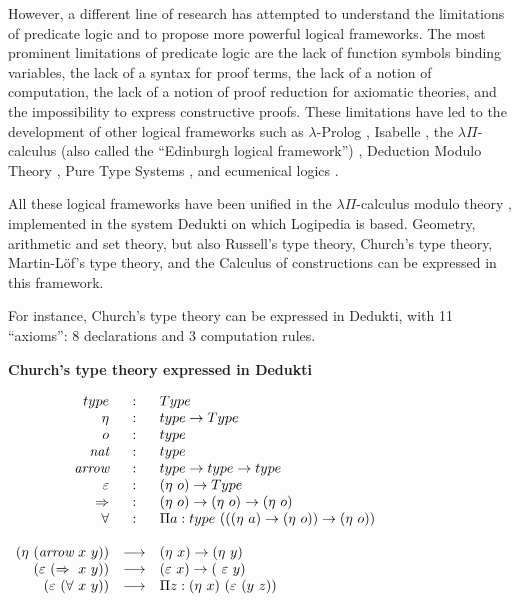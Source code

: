 However, a different line of research has attempted to understand the
limitations of predicate logic and to propose more powerful logical
frameworks.  The most prominent limitations of predicate logic are the
lack of function symbols binding variables, the lack of a syntax for
proof terms, the lack of a notion of computation, the lack of a notion
of proof reduction for axiomatic theories, and the impossibility to
express constructive proofs. These limitations have led to the
development of other logical frameworks such as $\lambda$-Prolog
\cite{MillerNadathur12}, Isabelle \cite{Paulson90},
the $\lambda \Pi$-calculus (also called the ``Edinburgh logical
framework'') \cite{HarperHonsellPlotkin91}, Deduction Modulo Theory
\cite{DowekHardinKirchner03, DowekWerner03}, Pure Type Systems
\cite{Berardi88,Terlouw89}, and ecumenical logics
\cite{Prawitz15,Dowek15,PereiraRodriguez17}.

All these logical frameworks have been unified in the $\lambda
\Pi$-calculus modulo theory \cite{CousineauDowek07}, implemented in
the system Dedukti \cite{Assaf16} on which Logipedia is
based. Geometry, arithmetic and set theory, but also Russell's type
theory, Church's type theory, Martin-L\"of's type theory, and the
Calculus of constructions can be expressed in this framework.

For instance, Church's type
theory can be expressed in Dedukti, with 11 ``axioms'': 8 declarations
and 3 computation rules.

\begin{shaded}
\vspace{-0.5cm}
\begin{center}
{\bf \Large Church's type theory expressed in Dedukti}
\end{center}

$\begin{array}{rcl}
type&:&Type\\
\eta&:&type \rightarrow Type\\
o&:&type\\
\mbox{\it nat}&:&type\\
\mbox{\it arrow}&:&type \rightarrow type \rightarrow type\\
\varepsilon&:&(\eta~o) \rightarrow Type\\
\Rightarrow&:&(\eta~o) \rightarrow (\eta~o) \rightarrow (\eta~o)\\
\forall&:&\Pi a:type~(((\eta~a) \rightarrow (\eta~o)) \rightarrow (\eta~o))\\
\\
(\eta~(\mbox{\it arrow}~x~y)) &\longrightarrow& (\eta~x) \rightarrow (\eta~y)\\
(\varepsilon~(\Rightarrow~x~y)) &\longrightarrow& (\varepsilon~x) \rightarrow (\
\varepsilon~y)\\
(\varepsilon~(\forall~x~y)) &\longrightarrow& \Pi z:(\eta~x)~(\varepsilon~(y~z))
\end{array}$
\end{shaded}

